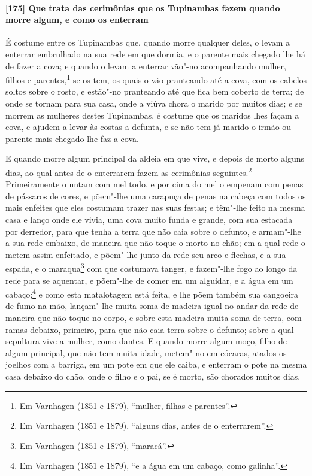 \begin{linenumbers}
\paragraph{[175] Que trata das cerimônias que os Tupinambas fazem quando morre algum, e como
os enterram}\quad
É costume entre os Tupinambas que, quando morre qualquer deles, o levam a enterrar
embrulhado na sua rede em que dormia, e o parente mais chegado lhe há de fazer a cova; e
quando o levam a enterrar vão"-no acompanhando mulher, filhos e parentes,\footnote{ Em
Varnhagen (1851 e 1879), ``mulher, filhas e parentes''.} se os tem, os quais o vão
pranteando até a cova, com os cabelos soltos sobre o rosto, e estão"-no pranteando até que
fica bem coberto de terra; de onde se tornam para sua casa, onde a viúva chora o marido
por muitos dias; e se morrem as mulheres destes Tupinambas, é costume que os maridos lhes
façam a cova, e ajudem a levar às costas a defunta, e se não tem já marido o irmão ou
parente mais chegado lhe faz a cova.

E quando morre algum principal da aldeia em que vive, e depois de morto alguns dias, ao
qual antes de o enterrarem fazem as cerimônias seguintes.\footnote{ Em Varnhagen (1851 e
1879), ``alguns dias, antes de o enterrarem''.} Primeiramente o untam com mel todo, e por
cima do mel o empenam com penas de pássaros de cores, e põem"-lhe uma carapuça de penas na
cabeça com todos os mais enfeites que eles costumam trazer nas suas festas; e têm"-lhe
feito na mesma casa e lanço onde ele vivia, uma cova muito funda e grande, com sua
estacada por derredor, para que tenha a terra que não caia sobre o defunto, e armam"-lhe a
sua rede embaixo, de maneira que não toque o morto no chão; em a qual rede o metem assim
enfeitado, e põem"-lhe junto da rede seu arco e flechas, e a sua espada, e o
maraqua\footnote{ Em Varnhagen (1851 e 1879), ``maracá''.} com que costumava tanger, e
fazem"-lhe fogo ao longo da rede para se aquentar, e põem"-lhe de comer em um alguidar, e a
água em um cabaço;\footnote{ Em Varnhagen (1851 e 1879), ``e a água em um cabaço, como
galinha''.} e como esta matalotagem está feita, e lhe põem também sua cangoeira de fumo na
mão, lançam"-lhe muita soma de madeira igual no andar da rede de maneira que não toque no
corpo, e sobre esta madeira muita soma de terra, com ramas debaixo, primeiro, para que não
caia terra sobre o defunto; sobre a qual sepultura vive a mulher, como dantes. E quando
morre algum moço, filho de algum principal, que não tem muita idade, metem"-no em cócaras,
atados os joelhos com a barriga, em um pote em que ele caiba, e enterram o pote na mesma
casa debaixo do chão, onde o filho e o pai, se é morto, são chorados muitos dias.


\end{linenumbers}
